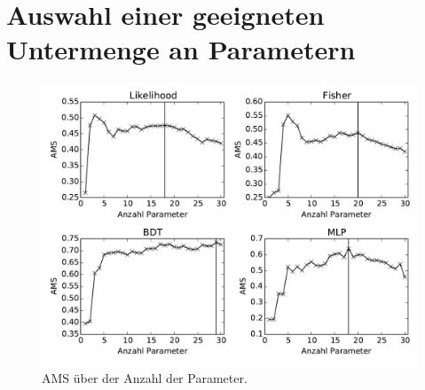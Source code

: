 \section{Auswahl einer geeigneten Untermenge an Parametern}

\begin{figure}[htp]
\begin{center}
  \includegraphics[width=\linewidth]{sections/subset_of_parameters/parameter_count_ranking_by_method.pdf}
  \caption[AMS über der Anzahl der Parameter]{AMS über der Anzahl der Parameter.}
  \label{ams_over_parameter_count}
\end{center}
\end{figure}

